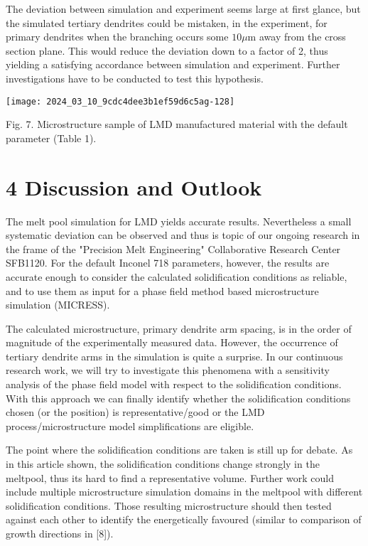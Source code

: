 \documentclass[10pt]{article}
\begin{document}
The deviation between simulation and experiment seems large at first glance, but the simulated tertiary dendrites could be mistaken, in the experiment, for primary dendrites when the branching occurs some $10 \mu \mathrm{m}$ away from the cross section plane. This would reduce the deviation down to a factor of 2, thus yielding a satisfying accordance between simulation and experiment. Further investigations have to be conducted to test this hypothesis.

\begin{center}
\texttt{[image: 2024\_03\_10\_9cdc4dee3b1ef59d6c5ag-128]}
\end{center}

Fig. 7. Microstructure sample of LMD manufactured material with the default parameter (Table 1).

\section*{4 Discussion and Outlook}
The melt pool simulation for LMD yields accurate results. Nevertheless a small systematic deviation can be observed and thus is topic of our ongoing research in the frame of the "Precision Melt Engineering" Collaborative Research Center SFB1120. For the default Inconel 718 parameters, however, the results are accurate enough to consider the calculated solidification conditions as reliable, and to use them as input for a phase field method based microstructure simulation (MICRESS).

The calculated microstructure, primary dendrite arm spacing, is in the order of magnitude of the experimentally measured data. However, the occurrence of tertiary dendrite arms in the simulation is quite a surprise. In our continuous research work, we will try to investigate this phenomena with a sensitivity analysis of the phase field model with respect to the solidification conditions. With this approach we can finally identify whether the solidification conditions chosen (or the position) is representative/good or the LMD process/microstructure model simplifications are eligible.

The point where the solidification conditions are taken is still up for debate. As in this article shown, the solidification conditions change strongly in the meltpool, thus its hard to find a representative volume. Further work could include multiple microstructure simulation domains in the meltpool with different solidification conditions. Those resulting microstructure should then tested against each other to identify the energetically favoured (similar to comparison of growth directions in [8]).
\end{document}
